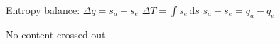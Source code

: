 Entropy balance:  
\( \Delta q = s_a - s_e \)  
\( \Delta T = \int s_e \, \text{d}s \)  
\( s_a - s_e = q_a - q_e \)  

No content crossed out.